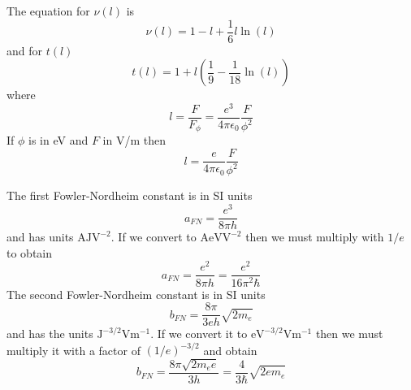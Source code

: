 \documentclass[a4paper,10pt]{article}
\numberwithin{equation}{section}
\begin{document}
The equation for \(\nu(l)\) is~\cite{Forbes08112007}
\begin{equation}
 \nu(l) = 1 - l + \frac{1}{6}l \ln(l)
\end{equation}
and for \(t(l)\)
\begin{equation}
  t(l) = 1 + l\left( \frac{1}{9} - \frac{1}{18}\ln(l) \right)
\end{equation}
where
\begin{equation}
 l = \frac{F}{F_\phi} = \frac{e^3}{4\pi\epsilon_0} \frac{F}{\phi^2}
\end{equation}
If \(\phi\) is in eV and \(F\) in V/m then
\begin{equation}
  l = \frac{e}{4\pi\epsilon_0} \frac{F}{\phi^2}
\end{equation}

The first Fowler-Nordheim constant is in SI units
\begin{equation}\label{eq:a_fn}
 a_{FN} = \frac{e^3}{8\pi h}
\end{equation}
and has units \(\mathrm{A}\mathrm{J}\mathrm{V}^{-2}\). If we convert to \(\mathrm{A}\mathrm{eV}\mathrm{V}^{-2}\) then
we must multiply with \(1/e\) to obtain
\begin{equation}\label{eq:b_fn}
 a_{FN} = \frac{e^2}{8\pi h} = \frac{e^2}{16\pi^2 \hbar}
\end{equation}
The second Fowler-Nordheim constant is in SI units
\begin{equation}
  b_{FN} = \frac{8\pi}{3eh}\sqrt{2m_e}
\end{equation}
and has the units \(\mathrm{J}^{-3/2}\mathrm{V}\mathrm{m}^{-1}\). If we convert it to \(\mathrm{eV}^{-3/2}\mathrm{V}\mathrm{m}^{-1}\) then
we must multiply it with a factor of \((1/e)^{-3/2}\) and obtain
\begin{equation}
 b_{FN} = \frac{8\pi\sqrt{2m_e e}}{3h} = \frac{4}{3\hbar}\sqrt{2em_e}
\end{equation}
\end{document}
